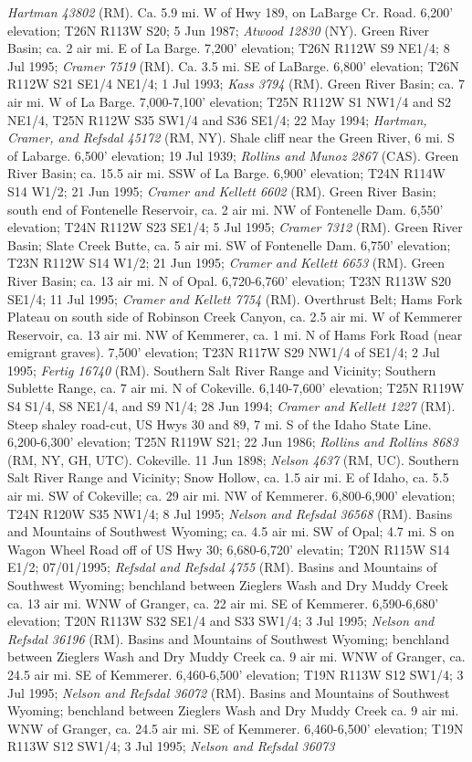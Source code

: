 \textit{Hartman 43802} (RM).  Ca. 5.9 mi. W of Hwy 189, on LaBarge Cr. Road. 6,200' elevation; T26N R113W S20; 5 Jun 1987; \textit{Atwood 12830} (NY).  Green River Basin; ca. 2 air mi. E of La Barge. 7,200' elevation; T26N R112W S9 NE1/4; 8 Jul 1995; \textit{Cramer 7519} (RM).  Ca. 3.5 mi. SE of LaBarge. 6,800' elevation; T26N R112W S21 SE1/4 NE1/4; 1 Jul 1993; \textit{Kass 3794} (RM).  Green River Basin; ca. 7 air mi. W of La Barge. 7,000-7,100' elevation; T25N R112W S1 NW1/4 and S2 NE1/4, T25N R112W S35 SW1/4 and S36 SE1/4; 22 May 1994; \textit{Hartman, Cramer, and Refsdal 45172} (RM, NY).  Shale cliff near the Green River, 6 mi. S of Labarge. 6,500' elevation; 19 Jul 1939; \textit{Rollins and Munoz 2867} (CAS).  Green River Basin; ca. 15.5 air mi. SSW of La Barge. 6,900' elevation; T24N R114W S14 W1/2; 21 Jun 1995; \textit{Cramer and Kellett 6602} (RM).  Green River Basin; south end of Fontenelle Reservoir, ca. 2 air mi. NW of Fontenelle Dam. 6,550' elevation; T24N R112W S23 SE1/4; 5 Jul 1995; \textit{Cramer 7312} (RM).  Green River Basin; Slate Creek Butte, ca. 5 air mi. SW of Fontenelle Dam. 6,750' elevation; T23N R112W S14 W1/2; 21 Jun 1995; \textit{Cramer and Kellett 6653} (RM).  Green River Basin; ca. 13 air mi. N of Opal. 6,720-6,760' elevation; T23N R113W S20 SE1/4; 11 Jul 1995; \textit{Cramer and Kellett 7754} (RM).  Overthrust Belt; Hams Fork Plateau on south side of Robinson Creek Canyon, ca. 2.5 air mi. W of Kemmerer Reservoir, ca. 13 air mi. NW of Kemmerer, ca. 1 mi. N of Hams Fork Road (near emigrant graves). 7,500' elevation; T23N R117W S29 NW1/4 of SE1/4; 2 Jul 1995; \textit{Fertig 16740} (RM).  Southern Salt River Range and Vicinity; Southern Sublette Range, ca. 7 air mi. N of Cokeville. 6,140-7,600' elevation; T25N R119W S4 S1/4, S8 NE1/4, and S9 N1/4; 28 Jun 1994; \textit{Cramer and Kellett 1227} (RM).  Steep shaley road-cut, US Hwys 30 and 89, 7 mi. S of the Idaho State Line. 6,200-6,300' elevation; T25N R119W S21; 22 Jun 1986; \textit{Rollins and Rollins 8683} (RM, NY, GH, UTC).  Cokeville. 11 Jun 1898; \textit{Nelson 4637} (RM, UC).  Southern Salt River Range and Vicinity; Snow Hollow, ca. 1.5 air mi. E of Idaho, ca. 5.5 air mi. SW of Cokeville; ca. 29 air mi. NW of Kemmerer.  6,800-6,900' elevation; T24N R120W S35 NW1/4; 8 Jul 1995; \textit{Nelson and Refsdal 36568} (RM).  Basins and Mountains of Southwest Wyoming; ca. 4.5 air mi. SW of Opal; 4.7 mi. S on Wagon Wheel Road off of US Hwy 30; 6,680-6,720' elevatin; T20N R115W S14 E1/2; 07/01/1995; \textit{Refsdal and Refsdal 4755} (RM).  Basins and Mountains of Southwest Wyoming; benchland between Zieglers Wash and Dry Muddy Creek ca. 13 air mi. WNW of Granger, ca. 22 air mi. SE of Kemmerer. 6,590-6,680' elevation; T20N R113W S32 SE1/4 and S33 SW1/4; 3 Jul 1995; \textit{Nelson and Refsdal 36196} (RM).  Basins and Mountains of Southwest Wyoming; benchland between Zieglers Wash and Dry Muddy Creek ca. 9 air mi. WNW of Granger, ca. 24.5 air mi. SE of Kemmerer. 6,460-6,500' elevation; T19N R113W S12 SW1/4; 3 Jul 1995; \textit{Nelson and Refsdal 36072} (RM).  Basins and Mountains of Southwest Wyoming; benchland between Zieglers Wash and Dry Muddy Creek ca. 9 air mi. WNW of Granger, ca. 24.5 air mi. SE of Kemmerer. 6,460-6,500' elevation; T19N R113W S12 SW1/4; 3 Jul 1995; \textit{Nelson and Refsdal 36073} 